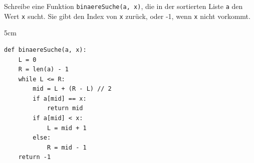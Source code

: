 \question[5]
Schreibe eine Funktion \texttt{binaereSuche(a, x)}, die in der sortierten Liste \texttt{a} den Wert \texttt{x} sucht. Sie gibt den Index von \texttt{x} zurück, oder -1, wenn \texttt{x} nicht vorkommt.
\begin{solutionbox}{5cm}
\begin{lstlisting}
def binaereSuche(a, x):
    L = 0
    R = len(a) - 1
    while L <= R:
        mid = L + (R - L) // 2
        if a[mid] == x:
            return mid
        if a[mid] < x:
            L = mid + 1
        else:
            R = mid - 1
    return -1
\end{lstlisting}
\end{solutionbox}
